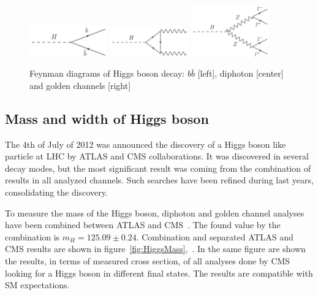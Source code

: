 \begin{figure}[!Hhtbp]
  \begin{center}
    \includegraphics[width=0.3\textwidth]{figs/BB_H.png}
    \includegraphics[width=0.3\textwidth]{figs/Diphoton_H.png}
    \includegraphics[width=0.3\textwidth]{figs/Golden_H.png}
    \caption{Feynman diagrams of Higgs boson decay: $b\bar{b}$ [left], diphoton [center] and golden channels [right]}
    \label{fig:HiggsDecays}
  \end{center}
\end{figure}

\subsection{Mass and width of Higgs boson}

The 4th of July of 2012 was announced the discovery of a Higgs boson like particle at LHC by ATLAS and CMS collaborations. It was discovered in several decay modes, but the most significant result was coming from the combination of results in all analyzed channels. Such searches have been refined during last years, consolidating the discovery. 

To measure the mass of the Higgs boson, diphoton and golden channel analyses have been combined between ATLAS and CMS~\cite{Aad:2015zhl}. The found value by the combination is $m_{H}=125.09\pm 0.24$. Combination and separated ATLAS and CMS results are shown in figure~\ref{fig:HiggsMass},~\cite{Aad:2015zhl,CMS:2014ega,ATLAS-CONF-2015-007}. In the same figure are shown the results, in terms of measured cross section, of all analyses done by CMS looking for a Higgs boson in different final states. The results are compatible with SM expectations.

